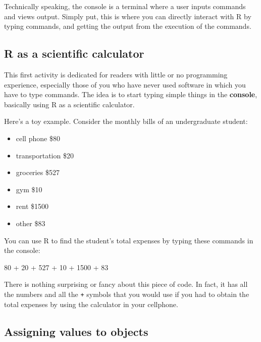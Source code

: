 \documentclass[
]{book}
\newenvironment{Shaded}{\begin{snugshade}}{\end{snugshade}}
\newcommand{\DecValTok}[1]{\textcolor[rgb]{0.00,0.00,0.81}{#1}}
\newcommand{\SpecialCharTok}[1]{\textcolor[rgb]{0.00,0.00,0.00}{#1}}
\providecommand{\tightlist}{%
  \setlength{\itemsep}{0pt}\setlength{\parskip}{0pt}}
\begin{document}
Technically speaking, the console is a terminal where a user inputs commands and
views output. Simply put, this is where you can directly interact with R by
typing commands, and getting the output from the execution of the commands.

\hypertarget{r-as-a-scientific-calculator}{%
\subsection{R as a scientific calculator}\label{r-as-a-scientific-calculator}}

This first activity is dedicated for readers with little or no programming
experience, especially those of you who have never used software in which you
have to type commands. The idea is to start typing simple things in the
\textbf{console}, basically using R as a scientific calculator.

Here's a toy example. Consider the monthly bills of an undergraduate student:

\begin{itemize}
\tightlist
\item
  cell phone \$80
\item
  transportation \$20
\item
  groceries \$527
\item
  gym \$10
\item
  rent \$1500
\item
  other \$83
\end{itemize}

You can use R to find the student's total expenses by typing these commands in
the console:

\begin{Shaded}
\begin{Highlighting}[]
\DecValTok{80} \SpecialCharTok{+} \DecValTok{20} \SpecialCharTok{+} \DecValTok{527} \SpecialCharTok{+} \DecValTok{10} \SpecialCharTok{+} \DecValTok{1500} \SpecialCharTok{+} \DecValTok{83}
\end{Highlighting}
\end{Shaded}

There is nothing surprising or fancy about this piece of code. In fact, it has
all the numbers and all the \texttt{+} symbols that you would use if you had to obtain
the total expenses by using the calculator in your cellphone.

\hypertarget{assigning-values-to-objects}{%
\subsection{Assigning values to objects}\label{assigning-values-to-objects}}
\end{document}
